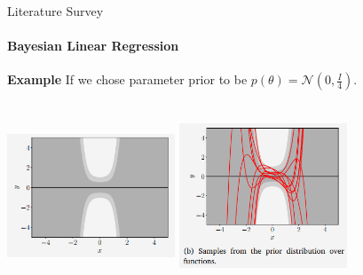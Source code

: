 \documentclass[handout,9pt]{beamer}
\numberwithin{theorem}{section}
\begin{document}
\begin{frame}{Literature Survey}
	\begin{spacing}{1}
		\framesubtitle{Bayesian Linear Regression}
		\textbf{Example} If we chose parameter prior to be $p(\theta) = \mathcal{N}(0, \frac{I}{4})$.
		\begin{center}
			\includegraphics[height=5.5cm, width=5cm]{graph15}
			\includegraphics[height=5.5cm, width=5cm]{graph16}
		\end{center}
\end{spacing}
\end{frame}
\end{document}
